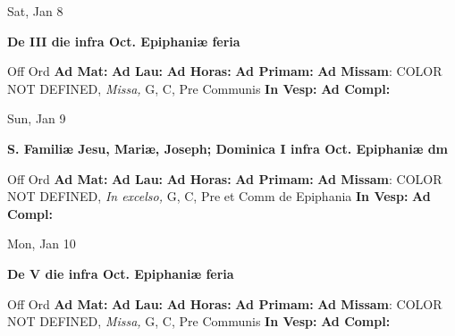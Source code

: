 \documentclass[10pt]{memoir}
\begin{document}
\begin{center}
\begin{minipage}{3.5in}
\vspace{2em}
\begin{center}Sat, Jan 8
\end{center}
\textbf{ \large De III die infra Oct. Epiphaniæ
\textnormal{\normalsize feria}}

\begin{justify}Off Ord
\textbf{Ad Mat: }
\textbf{Ad Lau: }
\textbf{Ad Horas: }
\textbf{Ad Primam: }\textbf{Ad Missam}: COLOR NOT DEFINED, \textit{Missa,} G, C, Pre Communis
\textbf{In Vesp: }
\textbf{Ad Compl: }
\end{justify}
\end{minipage}
\end{center}

\begin{center}
\begin{minipage}{3.5in}
\vspace{2em}
\begin{center}Sun, Jan 9
\end{center}
\textbf{ \large S. Familiæ Jesu, Mariæ, Joseph; Dominica I infra Oct. Epiphaniæ
\textnormal{\normalsize dm}}

\begin{justify}Off Ord
\textbf{Ad Mat: }
\textbf{Ad Lau: }
\textbf{Ad Horas: }
\textbf{Ad Primam: }\textbf{Ad Missam}: COLOR NOT DEFINED, \textit{In excelso,} G, C, Pre et Comm de Epiphania
\textbf{In Vesp: }
\textbf{Ad Compl: }
\end{justify}
\end{minipage}
\end{center}

\begin{center}
\begin{minipage}{3.5in}
\vspace{2em}
\begin{center}Mon, Jan 10
\end{center}
\textbf{ \large De V die infra Oct. Epiphaniæ
\textnormal{\normalsize feria}}

\begin{justify}Off Ord
\textbf{Ad Mat: }
\textbf{Ad Lau: }
\textbf{Ad Horas: }
\textbf{Ad Primam: }\textbf{Ad Missam}: COLOR NOT DEFINED, \textit{Missa,} G, C, Pre Communis
\textbf{In Vesp: }
\textbf{Ad Compl: }
\end{justify}
\end{minipage}
\end{center}
\end{document}
